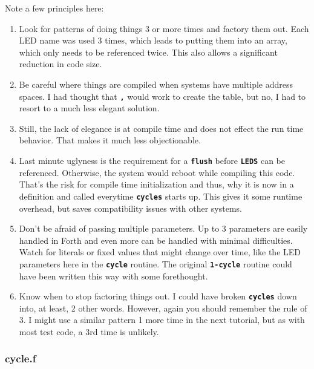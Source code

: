 \documentclass[10pt,english]{article}
\begin{document}
Note a few principles here:
\begin{enumerate}
\item Look for patterns of doing things 3 or more times and factory them
out. Each LED name was used 3 times, which leads to putting them into
an array, which only needs to be referenced twice. This also allows
a significant reduction in code size.
\item Be careful where things are compiled when systems have multiple address
spaces. I had thought that \texttt{\textbf{,}} would work to create
the table, but no, I had to resort to a much less elegant solution.
\item Still, the lack of elegance is at compile time and does not effect
the run time behavior. That makes it much less objectionable.
\item Last minute uglyness is the requirement for a \texttt{\textbf{flush}}
before \texttt{\textbf{LEDS}} can be referenced. Otherwise, the system
would reboot while compiling this code. That's the risk for compile
time initialization and thus, why it is now in a definition and called
everytime \texttt{\textbf{cycles}} starts up. This gives it some runtime
overhead, but saves compatibility issues with other systems.
\item Don't be afraid of passing multiple parameters. Up to 3 parameters
are easily handled in Forth and even more can be handled with minimal
difficulties. Watch for literals or fixed values that might change
over time, like the LED parameters here in the \texttt{\textbf{cycle}}
routine. The original \texttt{\textbf{1-cycle}} routine could have
been written this way with some forethought.
\item Know when to stop factoring things out. I could have broken \texttt{\textbf{cycles}}
down into, at least, 2 other words. However, again you should remember
the rule of 3. I might use a similar pattern 1 more time in the next
tutorial, but as with most test code, a 3rd time is unlikely.
\end{enumerate}

\subsubsection{cycle.f}
\end{document}
